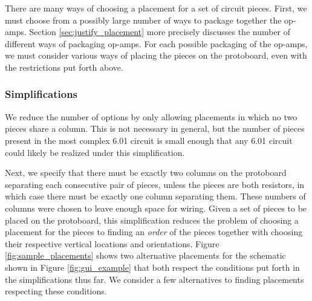 There are many ways of choosing a placement for a set of circuit pieces.
First, we must choose from a possibly large number of ways
to package together the op-amps. Section \ref{sec:justify_placement} more
precisely discusses the number of different ways of packaging op-amps.
For each possible packaging of the
op-amps, we must consider various ways of placing the pieces on the protoboard,
even with the restrictions put forth above.

\subsubsection{Simplifications}

We reduce the number of options by only allowing placements in which no
two pieces share a column. This is not necessary in general, but the
number of pieces present in the most complex 6.01 circuit is small enough that
any 6.01 circuit could likely be realized under this simplification.

Next, we specify that there must be exactly two columns on the protoboard
separating
each consecutive pair of pieces, unless the pieces are both resistors, in which
case there must be exactly one column separating them. These numbers of columns
were chosen to leave enough space for wiring. Given a set of pieces to be placed
on the protoboard, this simplification reduces the
problem of choosing a placement for the pieces to finding an \emph{order} of the
pieces together with choosing their respective vertical locations and
orientations. Figure \ref{fig:sample_placements} shows two alternative
placements for the schematic shown in Figure \ref{fig:gui_example} that both
respect the conditions put forth in the simplifications thus far.
We consider a few alternatives to finding placements respecting these conditions.

